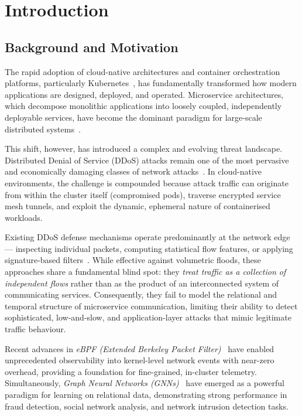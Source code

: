 \chapter{Introduction}
\label{ch:introduction}

\section{Background and Motivation}
\label{sec:motivation}

The rapid adoption of cloud-native architectures and container orchestration platforms,
particularly Kubernetes~\cite{kubernetes2014}, has fundamentally transformed how modern
applications are designed, deployed, and operated. Microservice architectures, which
decompose monolithic applications into loosely coupled, independently deployable services,
have become the dominant paradigm for large-scale distributed systems~\cite{microservices_survey}.

This shift, however, has introduced a complex and evolving threat landscape. Distributed
Denial of Service (DDoS) attacks remain one of the most pervasive and economically
damaging classes of network attacks~\cite{cloudflare_threat_report_2024}. In cloud-native
environments, the challenge is compounded because attack traffic can originate from within
the cluster itself (compromised pods), traverse encrypted service mesh tunnels, and exploit
the dynamic, ephemeral nature of containerised workloads.

Existing DDoS defense mechanisms operate predominantly at the network edge ---
inspecting individual packets, computing statistical flow features, or applying
signature-based filters~\cite{aws_shield, cloudflare_magic_transit}. While effective
against volumetric floods, these approaches share a fundamental blind spot: they
\emph{treat traffic as a collection of independent flows} rather than as the product of an
interconnected system of communicating services. Consequently, they fail to model the
relational and temporal structure of microservice communication, limiting their ability to
detect sophisticated, low-and-slow, and application-layer attacks that mimic legitimate
traffic behaviour.

Recent advances in \emph{eBPF (Extended Berkeley Packet Filter)}~\cite{gregg2019bpf}
have enabled unprecedented observability into kernel-level network events with near-zero
overhead, providing a foundation for fine-grained, in-cluster telemetry. Simultaneously,
\emph{Graph Neural Networks (GNNs)}~\cite{zhou2020gnn_survey} have emerged as a powerful
paradigm for learning on relational data, demonstrating strong performance in
fraud detection, social network analysis, and network intrusion detection tasks.

